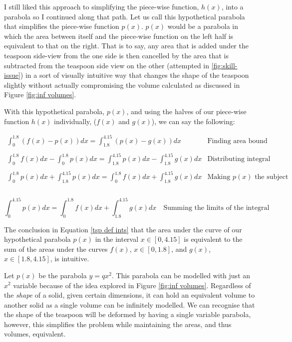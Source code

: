 \documentclass[12pt]{article}
\begin{document}
I still liked this approach to simplifying the piece-wise function, $h(x)$, into a parabola so I continued along that path. Let us call this hypothetical parabola that simplifies the piece-wise function $p(x)$. $p(x)$ would be a parabola in which the area between itself and the piece-wise function on the left half is equivalent to that on the right. That is to say, any area that is added under the teaspoon side-view from the one side is then cancelled by the area that is subtracted from the teaspoon side view on the other (attempted in \ref{fig:skill-issue}) in a sort of visually intuitive way that changes the shape of the teaspoon slightly without actually compromising the volume calculated as discussed in Figure \ref{fig:inf volumes}.

With this hypothetical parabola, $p(x)$, and using the halves of our piece-wise function $h(x)$ individually, ($f(x)$ and $g(x)$), we can say the following:

$$
\begin{array}{l|c}
    \int_0^{1.8}{(f(x)-p(x))}dx = \int_{1.8}^{4.15}{(p(x)-g(x))}dx & \text{Finding area bound} \\ \\
    \int_0^{1.8}{f(x)}dx - \int_0^{1.8}{p(x)}dx = \int_{1.8}^{4.15}{p(x)}dx - \int_{1.8}^{4.15}{g(x)}dx & \text{Distributing integral} \\ \\
    \int_0^{1.8}{p(x)}dx + \int_{1.8}^{4.15}{p(x)}dx = \int_0^{1.8}{f(x)}dx +\int_{1.8}^{4.15}{g(x)}dx & \text{Making } p(x) \text{ the subject}\\ \\
 \end{array}
$$

\vspace{-8mm}

\begin{equation}\label{tsp def ints}
    \boxed{\int_{0}^{4.15}{p(x)}dx = \int_0^{1.8}{f(x)}dx +\int_{1.8}^{4.15}{g(x)}dx}  \quad \text{Summing the limits of the integral}
\end{equation}

The conclusion in Equation \ref{tsp def ints} that the area under the curve of our hypothetical parabola $p(x)$ in the interval $x \in [0,4.15]$ is equivalent to the sum of the areas under the curves $f(x)$, $x \in [0,1.8]$, and $g(x)$, $x \in [1.8,4.15]$, is intuitive. 

Let $p(x)$ be the parabola $y=qx^2$. This parabola can be modelled with just an $x^2$ variable because of the idea explored in Figure \ref{fig:inf volumes}. Regardless of the \textit{shape} of a solid, given certain dimensions, it can hold an equivalent volume to another solid as a single volume can be infinitely modelled. We can recognise that the shape of the teaspoon will be deformed by having a single variable parabola, however, this simplifies the problem while maintaining the areas, and thus volumes, equivalent. 
\end{document}
